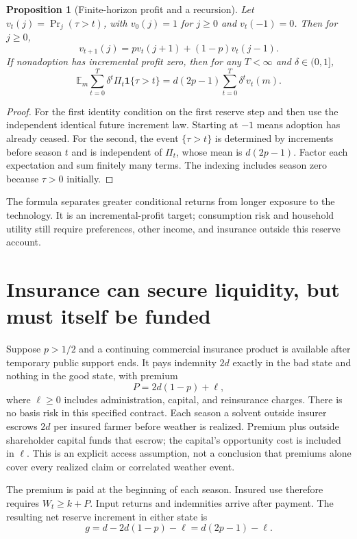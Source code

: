 \documentclass[11pt]{article}
\newtheorem{proposition}[theorem]{Proposition}
\theoremstyle{remark}
\newcommand{\E}{\mathbb E}
\newcommand{\Ind}{\mathbf 1}
\begin{document}
\begin{proposition}[Finite-horizon profit and a recursion]
Let $v_t(j)=\Pr_j(\tau>t)$, with $v_0(j)=1$ for $j\geq0$ and $v_t(-1)=0$. Then for $j\geq0$,
\[
 v_{t+1}(j)=pv_t(j+1)+(1-p)v_t(j-1).
\]
If nonadoption has incremental profit zero, then for any $T<\infty$ and $\delta\in(0,1]$,
\[
 \E_m\sum_{t=0}^T\delta^t\Pi_t\Ind\{\tau>t\}
       =d(2p-1)\sum_{t=0}^T\delta^t v_t(m).
\]
\end{proposition}
\begin{proof}
For the first identity condition on the first reserve step and then use the independent identical future increment law. Starting at $-1$ means adoption has already ceased. For the second, the event $\{\tau>t\}$ is determined by increments before season $t$ and is independent of $\Pi_t$, whose mean is $d(2p-1)$. Factor each expectation and sum finitely many terms. The indexing includes season zero because $\tau>0$ initially.
\end{proof}

The formula separates greater conditional returns from longer exposure to the technology. It is an incremental-profit target; consumption risk and household utility still require preferences, other income, and insurance outside this reserve account.

\section{Insurance can secure liquidity, but must itself be funded}
Suppose $p>1/2$ and a continuing commercial insurance product is available after temporary public support ends. It pays indemnity $2d$ exactly in the bad state and nothing in the good state, with premium
\[
 P=2d(1-p)+\ell,
\]
where $\ell\geq0$ includes administration, capital, and reinsurance charges. There is no basis risk in this specified contract. Each season a solvent outside insurer escrows $2d$ per insured farmer before weather is realized. Premium plus outside shareholder capital funds that escrow; the capital's opportunity cost is included in $\ell$. This is an explicit access assumption, not a conclusion that premiums alone cover every realized claim or correlated weather event.

The premium is paid at the beginning of each season. Insured use therefore requires $W_t\geq k+P$. Input returns and indemnities arrive after payment. The resulting net reserve increment in either state is
\[
 g=d-2d(1-p)-\ell=d(2p-1)-\ell.
\]
\end{document}
